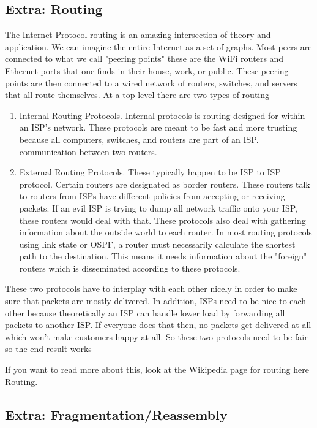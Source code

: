 \subsection{Extra: Routing}

The Internet Protocol routing is an amazing intersection of theory and application.
We can imagine the entire Internet as a set of graphs.
Most peers are connected to what we call "peering points" these are the WiFi routers and Ethernet ports that one finds in their house, work, or public.
These peering points are then connected to a wired network of routers, switches, and servers that all route themselves.
At a top level there are two types of routing

\begin{enumerate}
\item Internal Routing Protocols.
  Internal protocols is routing designed for within an ISP's network.
  These protocols are meant to be fast and more trusting because all computers, switches, and routers are part of an ISP.
  communication between two routers.
\item External Routing Protocols.
  These typically happen to be ISP to ISP protocol.
  Certain routers are designated as border routers.
  These routers talk to routers from ISPs have different policies from accepting or receiving packets.
  If an evil ISP is trying to dump all network traffic onto your ISP, these routers would deal with that.
  These protocols also deal with gathering information about the outside world to each router.
  In most routing protocols using link state or OSPF, a router must necessarily calculate the shortest path to the destination.
  This means it needs information about the "foreign" routers which is disseminated according to these protocols.
\end{enumerate}

These two protocols have to interplay with each other nicely in order to make sure that packets are mostly delivered.
In addition, ISPs need to be nice to each other because theoretically an ISP can handle lower load by forwarding all packets to another ISP.
If everyone does that then, no packets get delivered at all which won't make customers happy at all.
So these two protocols need to be fair so the end result works

If you want to read more about this, look at the Wikipedia page for routing here \href{https://en.wikipedia.org/wiki/Routing}{Routing}.

\subsection{Extra: Fragmentation/Reassembly}

